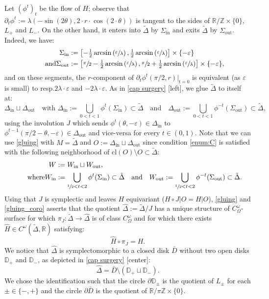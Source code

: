 \documentclass[11pt]{article}
\newcommand{\resp}{resp.\xspace}
\let\epsilon\varepsilon
\newcommand{\cl}{\mathrm{cl}}
\newcommand\R{\mathbb R}
\newcommand\D{\mathbb D}
\newcommand\Z{\mathbb Z}
\newcommand\qand{\quad \text{and}\quad}
\theoremstyle{definition}
\begin{document}
Let $(\phi^t)_t$ be the flow of $H$; observe that $\partial_t \phi^t:= \lambda(-\sin(2\theta), 2\cdot r\cdot \cos(2\cdot \theta))$ is tangent to the sides of $\R/\Z\times \{0\}$, $L_+$ and $L_-$.
On the other hand, it enters into $\tilde \Delta$ by $\Sigma_\mathrm{in}$ and exits $\tilde \Delta$ by $\Sigma_\mathrm{out}$. Indeed, we have:
\begin{align*}
\Sigma_\mathrm{in}&:= \left[- \tfrac12 \arcsin\left(\sfrac \epsilon\lambda \right),\tfrac12 \arcsin\left(\sfrac \epsilon\lambda \right)\right]\times \{-\epsilon\}\\
\tag*{and}
\Sigma_\mathrm{out}&:= \left[\sfrac\pi2 - \tfrac12 \arcsin\left(\sfrac \epsilon\lambda \right),\sfrac\pi2 +\tfrac12 \arcsin\left(\sfrac \epsilon\lambda \right)\right]\times \{-\epsilon\},
\end{align*}
and on these segments, the $r$-component of $ \partial_t \phi^t(\pi/2, r)|_{t=0}$ is equivalent (as $\epsilon$ is small) to \resp $2\lambda \cdot \epsilon$ and $-2\lambda \cdot \epsilon$.
As in \cref{cap surgery} [left], we glue $\tilde \Delta$ to itself at:
\[
\Delta_\mathrm{in}\sqcup \Delta_\mathrm{out}\quad \text{with }
\Delta_\mathrm{in}:=
\bigcup_{0< t<1} \phi^{t}(\Sigma_\mathrm{in}) \subset \tilde \Delta \qand \Delta_\mathrm{out}
:= \bigcup_{0< t<1} \phi^{-t}(\Sigma_\mathrm{out}) \subset \tilde \Delta,
\]
using the involution $J$ which sends $\phi^{t}(\theta, -\epsilon)\in \Delta_\mathrm{in}$ to $\phi^{t-1}(\pi/2-\theta, -\epsilon)\in \Delta_\mathrm{out}$ and vice-versa for every $t\in (0,1)$. Note that we can use \cref{gluing} with $M=\tilde \Delta$ and $O:= \Delta_\mathrm{in}\sqcup \Delta_\mathrm{out}$ since condition \eqref{enum:C} is satisfied with the following neighborhood of $\cl(O)\setminus O \subset \tilde \Delta$:
\begin{align*}
W&:=W_\mathrm{in}\sqcup W_\mathrm{out},\\
\tag*{where}
W_\mathrm{in}
&:= \bigcup_{\sfrac12 <t<2} \phi^t(\Sigma_\mathrm{in}) \subset \tilde \Delta
\qand
W_\mathrm{out}:= \bigcup_{\sfrac12 <t<2} \phi^{-t}(\Sigma_\mathrm{out})\subset \tilde \Delta.
\end{align*}
Using that $J$ is symplectic and leaves $H$ equivariant ($H\circ J|O= H|O$), \cref{gluing} and \cref{gluing_coro} asserts that the quotient $\widehat \Delta:= \tilde \Delta/J$ has a unique structure of $C^\omega_\Omega$\nobreakdash-surface for which $\pi_J: \tilde \Delta\to \widehat \Delta$ is of class $C^\omega_\Omega$ and for which there exists $\widehat H\in C^\omega(\tilde \Delta, \R)$ satisfying:
\[\widehat H\circ \pi_J= H.\]
We notice that $\widehat \Delta$ is symplectomorphic to a closed disk $\bar D$ without two open disks $\D_+$ and $\D_-$, as depicted in \cref{cap surgery} [center]:
\[\widehat \Delta= \bar D \setminus (\D_+ \sqcup \D_-).\]
We chose the identification such that the circle $\partial \D_\pm $ is the quotient of $L_\pm$ for each $\pm\in\{ -,+\}$ and the circle $\partial \bar D $ is the quotient of $\R/\pi \Z\times \{0\}$.
\end{document}
